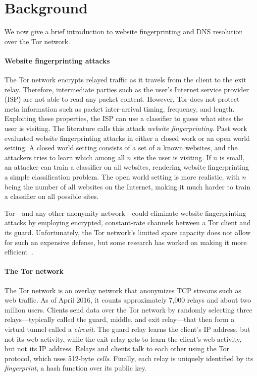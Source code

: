 \section{Background}
\label{sec:background}
We now give a brief introduction to website fingerprinting and DNS resolution
over the Tor network.

\paragraph{Website fingerprinting attacks}
The Tor network encrypts relayed traffic as it travels from the client to the
exit relay.  Therefore, intermediate parties such as the user's Internet service
provider (ISP) are not able to read any packet content.  However, Tor does not
protect meta information such as packet inter-arrival timing, frequency, and
length.  Exploiting these properties, the ISP can use a classifier to guess what
sites the user is visiting.  The literature calls this attack \emph{website
fingerprinting}.  Past work evaluated website fingerprinting attacks in either a
closed work or an open world setting.  A closed world setting consists of a set
of $n$ known websites, and the attackers tries to learn which among all $n$ site
the user is visiting.  If $n$ is small, an attacker can train a classifier on
all websites, rendering website fingerprinting a simple classification problem.
The open world setting is more realistic, with $n$ being the number of all
websites on the Internet, making it much harder to train a classifier on all
possible sites.

Tor---and any other anonymity network---could eliminate website fingerprinting
attacks by employing encrypted, constant-rate channels between a Tor client and
its guard.  Unfortunately, the Tor network's limited spare capacity does not
allow for such an expensive defense, but some research has worked on making it
more efficient~\cite{Cai2014a,DBLP:journals/corr/JuarezIPDW15,WangThesis}.

\paragraph{The Tor network}
The Tor network is an overlay network that anonymizes TCP streams such as web
traffic.  As of April 2016, it counts approximately 7,000 relays and about two
million users.  Clients send data over the Tor network by randomly selecting
three relays---typically called the guard, middle, and exit relay---that then
form a virtual tunnel called a \emph{circuit}.  The guard relay learns the
client's IP address, but not its web activity, while the exit relay gets to
learn the client's web activity, but not its IP address.  Relays and clients
talk to each other using the Tor protocol, which uses 512-byte \emph{cells}.
Finally, each relay is uniquely identified by its \emph{fingerprint}, a hash
function over its public key.


